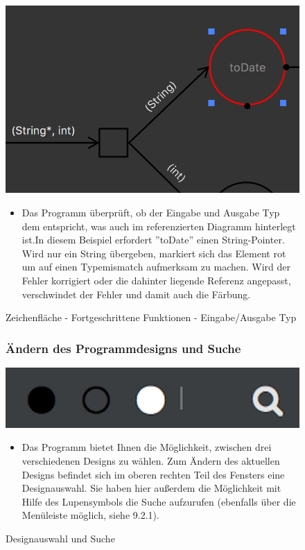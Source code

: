 \begin{figure}[h!]
	\centering
	\includegraphics[width=.6\textwidth]{Advanced3.png}
	\caption{Zeichenfläche - Fortgeschrittene Funktionen - Eingabe/Ausgabe Typ}
\begin{itemize}	
\item Das Programm überprüft, ob der Eingabe und Ausgabe Typ dem entspricht, was auch im referenzierten Diagramm hinterlegt ist.In diesem Beispiel erfordert ''toDate'' einen String-Pointer. Wird nur ein String übergeben, markiert sich das Element rot um auf einen Typemismatch aufmerksam zu machen. Wird der Fehler korrigiert oder die dahinter liegende Referenz angepasst, verschwindet der Fehler und damit auch die Färbung.
\end{itemize}
\end{figure}

\begin{figure}[h!]
\subsubsection{Ändern des Programmdesigns und Suche}
	\centering
	\includegraphics[width=.4\textwidth]{Design_Aendern.png}
	\caption{Designauswahl und Suche}
\begin{itemize}	
\item Das Programm bietet Ihnen die Möglichkeit, zwischen drei verschiedenen Designs zu wählen. Zum Ändern des aktuellen Designs befindet sich im oberen rechten Teil des Fensters eine Designauswahl. Sie haben hier außerdem die Möglichkeit mit Hilfe des Lupensymbols die Suche aufzurufen (ebenfalls über die Menüleiste möglich, siehe 9.2.1).
\end{itemize}
\end{figure}

